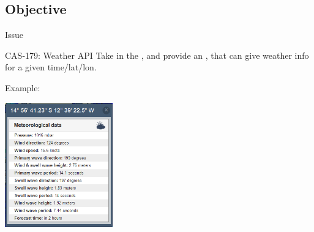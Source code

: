 \documentclass[xcolor=svgnames]{beamer}
\begin{document}
    \subsection{Objective}

        \begin{frame}{Issue}
            \begin{block}{CAS-179: Weather API}
                Take in the , and provide an , that can give weather info for a given time/lat/lon.
            \end{block}
            \vfill
            \pause
            Example:\\
            \begin{center}
                \includegraphics[width=0.35\textwidth]{img/weather_pufi}
            \end{center}
        \end{frame}

\end{document}
